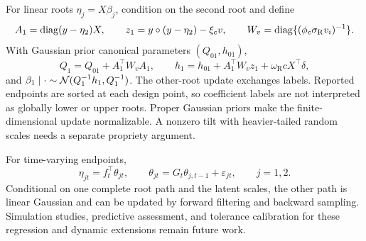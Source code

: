 For linear roots \(\eta_j=X\beta_j\), condition on the second root and define
\[
A_1=\operatorname{diag}(y-\eta_2)X,
\qquad
z_1=y\circ(y-\eta_2)-\xi_cv,
\qquad
W_v=\operatorname{diag}\{(\phi_c\sigma_{\mathrm R}v_i)^{-1}\}.
\]
With Gaussian prior canonical parameters \((Q_{01},h_{01})\),
\[
Q_1=Q_{01}+A_1^\top W_vA_1,
\qquad
h_1=h_{01}+A_1^\top W_vz_1
+\omega_{\mathrm R}cX^\top\delta,
\]
and \(\beta_1\mid\cdot\sim\mathcal{N}(Q_1^{-1}h_1,Q_1^{-1})\). The other-root
update exchanges labels. Reported endpoints are sorted at each design point,
so coefficient labels are not interpreted as globally lower or upper roots.
Proper Gaussian priors make the finite-dimensional update normalizable. A
nonzero tilt with heavier-tailed random scales needs a separate propriety
argument.

For time-varying endpoints,
\[
\eta_{jt}=f_t^\top\theta_{jt},
\qquad
\theta_{jt}=G_t\theta_{j,t-1}+\varepsilon_{jt},
\qquad j=1,2.
\]
Conditional on one complete root path and the latent scales, the other path is
linear Gaussian and can be updated by forward filtering and backward sampling.
Simulation studies, predictive assessment, and tolerance calibration for these
regression and dynamic extensions remain future work.
